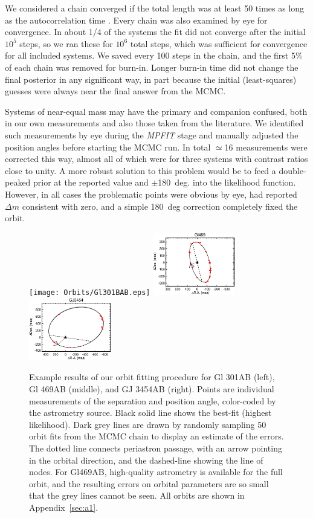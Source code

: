 \documentclass[twocolumn]{aastex62}
\begin{document}
We considered a chain converged if the total length was at least 50 times as long as the autocorrelation time \citep{2010CAMCS...5...65G}. Every chain was also examined by eye for convergence. In about 1/4 of the systems the fit did not converge after the initial $10^5$ steps, so we ran these for $10^6$ total steps, which was sufficient for convergence for all included systems. We saved every 100 steps in the chain, and the first 5\% of each chain was removed for burn-in. Longer burn-in time did not change the final posterior in any significant way, in part because the initial (least-squares) guesses were always near the final answer from the MCMC. 

Systems of near-equal mass may have the primary and companion confused, both in our own measurements and also those taken from the literature. We identified such measurements by eye during the \textit{MPFIT} stage and manually adjusted the position angles before starting the MCMC run. In total $\simeq$16 measurements were corrected this way, almost all of which were for three systems with contrast ratios close to unity. A more robust solution to this problem would be to feed a double-peaked prior at the reported value and $\pm$180~deg. into the likelihood function. However, in all cases the problematic points were obvious by eye, had reported $\Delta m$ consistent with zero, and a simple 180~deg correction completely fixed the orbit. 

\begin{figure}[htb]
\begin{center}
\texttt{[image: Orbits/Gl301BAB.eps]}
\includegraphics[width=0.32\textwidth]{Orbits/Gl469AB.eps}
\includegraphics[width=0.32\textwidth]{Orbits/GJ3454AB.eps}
\caption{Example results of our orbit fitting procedure for Gl 301AB (left), Gl 469AB (middle), and GJ 3454AB (right). Points are individual measurements of the separation and position angle, color-coded by the astrometry source. Black solid line shows the best-fit (highest likelihood). Dark grey lines are drawn by randomly sampling 50 orbit fits from the MCMC chain to display an estimate of the errors. The dotted line connects periastron passage, with an arrow pointing in the orbital direction, and the dashed-line showing the line of nodes. For Gl469AB, high-quality astrometry is available for the full orbit, and the resulting errors on orbital parameters are so small that the grey lines cannot be seen. All orbits are shown in Appendix~\ref{sec:a1}.}
\label{fig:orbits}
\end{center}
\end{figure}
\end{document}
